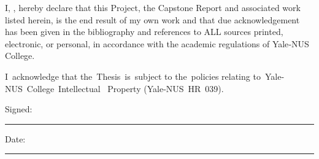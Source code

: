 \documentclass[
hidelinks,
12pt, %
oneside, %
english, %
doublespacing, %
headsepline, %
]{MastersDoctoralThesis} %
\begin{document}

\begin{declaration}
\addchaptertocentry{\authorshipname} %

\noindent I, \authorname, hereby declare that this Project, the Capstone Report and associated work listed herein, is the end result of my own work and that due acknowledgement has been given in the bibliography and references to ALL sources printed, electronic, or personal, in accordance with the academic regulations of Yale‐NUS College.

I acknowledge that the Thesis is subject to the policies relating to Yale‐NUS College Intellectual  Property (Yale‐NUS HR 039).


%

\noindent Signed:\\
\rule[0.5em]{25em}{0.5pt} %

\noindent Date:\\
\rule[0.5em]{25em}{0.5pt} %
\end{declaration}

\cleardoublepage
\end{document}
